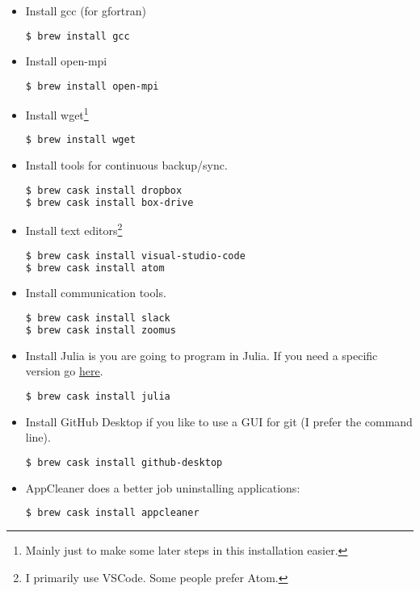 \begin{itemize}
\item Install gcc (for gfortran)
\begin{lstlisting}[language=bash]
$ brew install gcc
\end{lstlisting}

\item Install open-mpi
\begin{lstlisting}[language=bash]
$ brew install open-mpi
\end{lstlisting}

\item Install wget\footnote{Mainly just to make some  later steps in this installation easier.}
\begin{lstlisting}[language=bash]
$ brew install wget
\end{lstlisting}

\item Install tools for continuous backup/sync.
\begin{lstlisting}[language=bash]
$ brew cask install dropbox
$ brew cask install box-drive
\end{lstlisting}

\item Install text editors\footnote{I primarily use VSCode.  Some people prefer Atom.}
\begin{lstlisting}[language=bash]
$ brew cask install visual-studio-code
$ brew cask install atom
\end{lstlisting}

\item Install communication tools.
\begin{lstlisting}[language=bash]
$ brew cask install slack
$ brew cask install zoomus
\end{lstlisting}

\item Install Julia is you are going to program in Julia.  If you need a specific version go \href{https://julialang.org/downloads/}{here}.
\begin{lstlisting}[language=bash]
$ brew cask install julia
\end{lstlisting}

\item Install GitHub Desktop if you like to use a GUI for git (I prefer the command line).
\begin{lstlisting}[language=bash]
$ brew cask install github-desktop
\end{lstlisting}

\item AppCleaner does a better job uninstalling applications:
\begin{lstlisting}[language=bash]
$ brew cask install appcleaner
\end{lstlisting}


\end{itemize}
